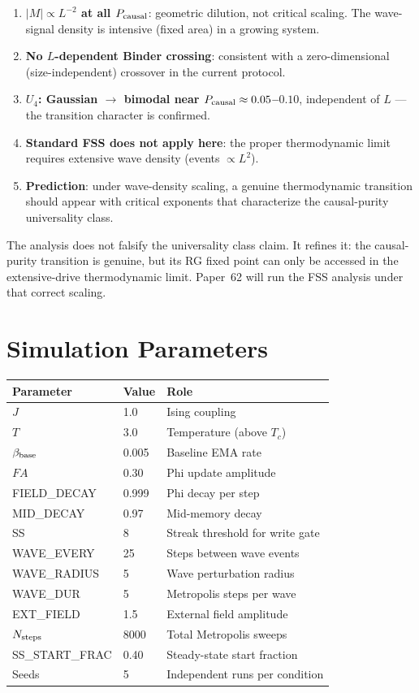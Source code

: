 \documentclass[12pt,a4paper]{article}
\begin{document}
\begin{enumerate}
  \item \textbf{$|M| \propto L^{-2}$ at all $P_{\rm causal}$}: geometric dilution, not critical scaling.
    The wave-signal density is intensive (fixed area) in a growing system.
  \item \textbf{No $L$-dependent Binder crossing}: consistent with a zero-dimensional
    (size-independent) crossover in the current protocol.
  \item \textbf{$U_4$: Gaussian $\to$ bimodal near $P_{\rm causal} \approx 0.05$--$0.10$},
    independent of $L$ --- the transition character is confirmed.
  \item \textbf{Standard FSS does not apply here}: the proper thermodynamic limit
    requires extensive wave density (events $\propto L^2$).
  \item \textbf{Prediction}: under wave-density scaling, a genuine thermodynamic
    transition should appear with critical exponents that characterize the
    causal-purity universality class.
\end{enumerate}

The analysis does not falsify the universality class claim.
It refines it: the causal-purity transition is genuine, but its RG fixed point
can only be accessed in the extensive-drive thermodynamic limit.
Paper~62 will run the FSS analysis under that correct scaling.

\appendix
\section{Simulation Parameters}

\begin{center}
\begin{tabular}{lll}
\toprule
Parameter & Value & Role \\
\midrule
$J$ & 1.0 & Ising coupling \\
$T$ & 3.0 & Temperature (above $T_c$) \\
$\beta_{\rm base}$ & 0.005 & Baseline EMA rate \\
$FA$ & 0.30 & Phi update amplitude \\
FIELD\_DECAY & 0.999 & Phi decay per step \\
MID\_DECAY & 0.97 & Mid-memory decay \\
SS & 8 & Streak threshold for write gate \\
WAVE\_EVERY & 25 & Steps between wave events \\
WAVE\_RADIUS & 5 & Wave perturbation radius \\
WAVE\_DUR & 5 & Metropolis steps per wave \\
EXT\_FIELD & 1.5 & External field amplitude \\
$N_{\rm steps}$ & 8000 & Total Metropolis sweeps \\
SS\_START\_FRAC & 0.40 & Steady-state start fraction \\
Seeds & 5 & Independent runs per condition \\
\bottomrule
\end{tabular}
\end{center}
\end{document}
